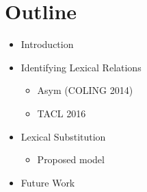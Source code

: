 \documentclass[letterpaper,11pt]{article}
\begin{document}
\pagebreak
\section{Outline}
\begin{itemize}
  \item Introduction
  \item Identifying Lexical Relations
    \begin{itemize}
      \item Asym (COLING 2014)
      \item TACL 2016
    \end{itemize}
  \item Lexical Substitution
    \begin{itemize}
      \item Proposed model
    \end{itemize}
  \item Future Work
\end{itemize}

\pagebreak


\end{document}
